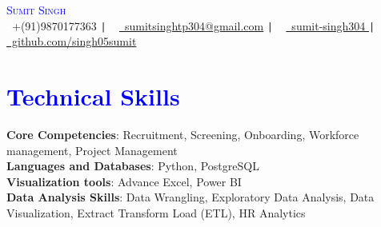 \documentclass[letterpaper,11pt]{article}
\begin{document}
\begin{center}
    {\Huge \scshape \textcolor{blue}{ Sumit Singh}} \\ \vspace{5pt}
    \small \raisebox{-0.1\height}\faPhone\ +(91)9870177363 \texttt{|} ~ \href{mailto:sumitsinghtp304@gmail.com}{\raisebox{-0.2\height}\faEnvelope\  sumitsinghtp304@gmail.com} \texttt{|} ~ 
    \href{https://linkedin.com/in/sumit-singh304/}{\raisebox{-0.2\height}\faLinkedin\ sumit-singh304  } \texttt{|} ~
    \href{https://github.com/singh05sumit}{\raisebox{-0.2\height}\faGithub\ github.com/singh05sumit    }
   
    \vspace{-15pt}
\end{center}\vspace{+5pt}

        \section{\textcolor{blue}{Technical Skills}}
            \vspace{5pt}
        \begin{itemize}[leftmargin=0.0in, label={}]
              \normalsize{\item{
              \textbf{Core Competencies}{: Recruitment, Screening, Onboarding, Workforce management, Project Management } \\
        	 \vspace{4pt}
              \textbf{Languages and Databases}{: Python, PostgreSQL} \\
        	\vspace{4pt}
              \textbf{Visualization tools}{: Advance Excel, Power BI} \\
            \vspace{4pt}
              \textbf{Data Analysis Skills}}{: Data Wrangling, Exploratory Data Analysis, Data Visualization, Extract Transform Load (ETL), HR Analytics } \\
            }
        \end{itemize}

       \vspace{2pt}



\end{document}
